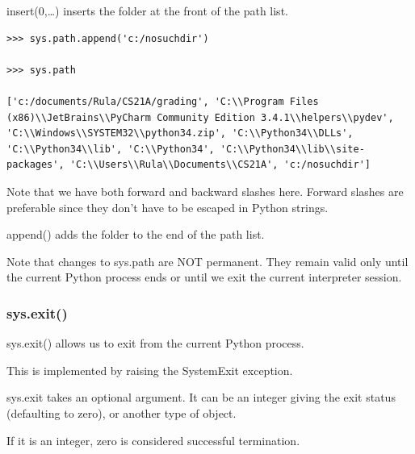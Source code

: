 \documentclass{article}
\begin{document}
insert(0,…) inserts the folder at the front of the path list.

\begin{lstlisting}
>>> sys.path.append('c:/nosuchdir')

>>> sys.path

['c:/documents/Rula/CS21A/grading', 'C:\\Program Files (x86)\\JetBrains\\PyCharm Community Edition 3.4.1\\helpers\\pydev', 'C:\\Windows\\SYSTEM32\\python34.zip', 'C:\\Python34\\DLLs', 'C:\\Python34\\lib', 'C:\\Python34', 'C:\\Python34\\lib\\site-packages', 'C:\\Users\\Rula\\Documents\\CS21A', 'c:/nosuchdir']
\end{lstlisting}

Note that we have both forward and backward slashes here.  Forward slashes are preferable since they don’t have to be escaped in Python strings.

append() adds the folder to the end of the path list.

Note that changes to sys.path are NOT permanent.  They remain valid only until the current Python process ends or until we exit the current interpreter session.

\subsubsection{sys.exit()}

sys.exit() allows us to exit from the current Python process. 

This is implemented by raising the SystemExit exception.

sys.exit takes an optional argument.  It can be an integer giving the exit status (defaulting to zero), or another type of object. 

If it is an integer, zero is considered successful termination. 
\end{document}

